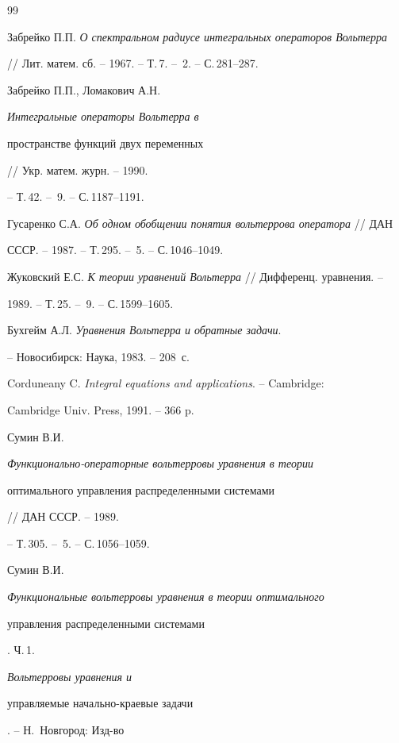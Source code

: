 \begin{thebibliography}{99}





\bibitem{}


Забрейко П.П. {\em О спектральном радиусе интегральных операторов Вольтерра}


// Лит. матем. сб. -- 1967. -- Т.\,7. -- \No\,2. -- С.\,281--287.




Забрейко П.П., Ломакович А.Н. {\em Интегральные операторы Вольтерра в


пространстве функций двух переменных} // Укр. матем. журн. -- 1990.


-- Т.\,42. -- \No\,9. -- С.\,1187--1191.




Гусаренко С.А. {\em Об одном обобщении понятия вольтеррова оператора} // ДАН 


СССР. -- 1987. -- Т.\,295. -- \No\,5. -- С.\,1046--1049.




Жуковский Е.С. {\em К теории уравнений Вольтерра} // Дифференц. уравнения. --


1989. -- Т.\,25. -- \No\,9. -- С.\,1599--1605.




Бухгейм А.Л. {\em Уравнения Вольтерра и обратные задачи}.


-- Новосибирск: Наука, 1983. -- 208~с.




Corduneany C. {\em Integral equations and applications}. -- Cambridge:


Cambridge Univ. Press, 1991. -- 366 p.




Сумин В.И. {\em Функционально-операторные вольтерровы уравнения в теории 


оптимального управления распределенными системами} // ДАН СССР. -- 1989.


-- Т.\,305. -- \No\,5. -- С.\,1056--1059.




Сумин В.И. {\em Функциональные вольтерровы уравнения в теории оптимального


управления распределенными системами}. Ч.\,1. {\em Вольтерровы уравнения и


управляемые начально-краевые задачи}. -- Н.~Новгород: Изд-во



\end{thebibliography}
